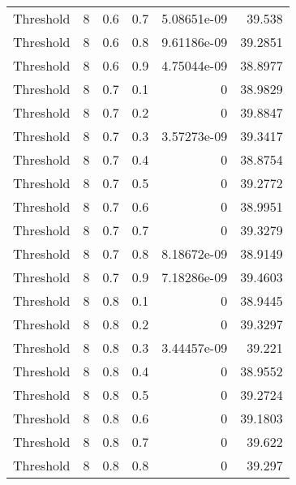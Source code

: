 \documentclass{article}
\begin{document}
\begin{longtable}[H]{lrrrrr}
 Threshold      &       8 &   0.6 &            0.7 &      5.08651e-09 &         39.538  \\
 Threshold      &       8 &   0.6 &            0.8 &      9.61186e-09 &         39.2851 \\
 Threshold      &       8 &   0.6 &            0.9 &      4.75044e-09 &         38.8977 \\
 Threshold      &       8 &   0.7 &            0.1 &      0           &         38.9829 \\
 Threshold      &       8 &   0.7 &            0.2 &      0           &         39.8847 \\
 Threshold      &       8 &   0.7 &            0.3 &      3.57273e-09 &         39.3417 \\
 Threshold      &       8 &   0.7 &            0.4 &      0           &         38.8754 \\
 Threshold      &       8 &   0.7 &            0.5 &      0           &         39.2772 \\
 Threshold      &       8 &   0.7 &            0.6 &      0           &         38.9951 \\
 Threshold      &       8 &   0.7 &            0.7 &      0           &         39.3279 \\
 Threshold      &       8 &   0.7 &            0.8 &      8.18672e-09 &         38.9149 \\
 Threshold      &       8 &   0.7 &            0.9 &      7.18286e-09 &         39.4603 \\
 Threshold      &       8 &   0.8 &            0.1 &      0           &         38.9445 \\
 Threshold      &       8 &   0.8 &            0.2 &      0           &         39.3297 \\
 Threshold      &       8 &   0.8 &            0.3 &      3.44457e-09 &         39.221  \\
 Threshold      &       8 &   0.8 &            0.4 &      0           &         38.9552 \\
 Threshold      &       8 &   0.8 &            0.5 &      0           &         39.2724 \\
 Threshold      &       8 &   0.8 &            0.6 &      0           &         39.1803 \\
 Threshold      &       8 &   0.8 &            0.7 &      0           &         39.622  \\
 Threshold      &       8 &   0.8 &            0.8 &      0           &         39.297  \\

\end{longtable}
\end{document}
